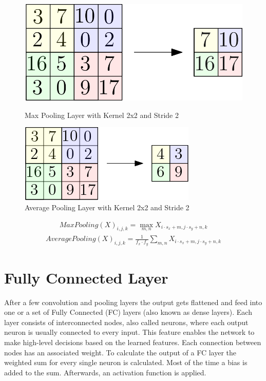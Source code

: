 \documentclass[
a4paper, 
12pt,
grayscalebody, %
abstract=on,
twoside, BCOR10mm, 12pt, DIV13,headinclude, footexclude, final, abstracton, openright
]{ibireprt}
\numberwithin{equation}{chapter}
\numberwithin{table}{chapter}
\numberwithin{figure}{chapter}
\numberwithin{algorithm}{chapter}
\numberwithin{example}{chapter}
\numberwithin{example}{chapter}
\begin{document}
\begin{figure}[h]
	\centering
	\begin{minipage}[t]{.45\linewidth}
		\centering
		\includegraphics[width = \textwidth]{max_pool.png}%
		\caption{Max Pooling Layer with Kernel 2x2 and Stride 2}
		\label{fig:fig_max_pooling}
		
	\end{minipage}
	\hfill
	\begin{minipage}[t]{.45\linewidth}
		\centering
		\includegraphics[width = \textwidth]{average_pool.png}%
		\caption{Average Pooling Layer with Kernel 2x2 and Stride 2}
		\label{fig:fig_average_pooling}
	\end{minipage}
\end{figure}
\begin{align}
	MaxPooling(X)_{i,j,k} = \max_{m,n}X_{i\cdot s_x + m, j \cdot s_y+n,k}
\end{align}
\begin{align}
	AveragePooling(X)_{i,j,k} =\frac{1}{f_x\cdot f_y}\sum_{m,n} X_{i\cdot s_x + m, j \cdot s_y+n,k}
\end{align}

\section{Fully Connected Layer}
After a few convolution and pooling layers the output gets flattened and feed into one or a set of Fully Connected (FC) layers (also known as dense layers). Each layer consists of interconnected nodes, also called neurons, where each output neuron is usually connected to every input. This feature enables the network to make high-level decisions based on the learned features. Each connection between nodes has an associated weight. To calculate the output of a FC layer the weighted sum for every single neuron is calculated. Most of the time a bias is added to the sum. Afterwards, an activation function is applied. 
\end{document}
